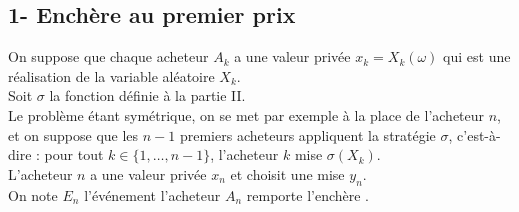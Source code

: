 \subsection*{1- Enchère au premier prix}

\noindent
On suppose que chaque acheteur $A_k$ a une valeur privée $x_k = 
X_k(\omega)$ qui est une réalisation de la variable aléatoire $X_k$.\\
Soit $\sigma$ la fonction définie à la partie II.\\
Le problème étant symétrique, on se met par exemple à la place de 
l'acheteur $n$, et on suppose que les $n-1$ premiers acheteurs 
appliquent la stratégie $\sigma$, c'est-à-dire : pour tout $k\in \{1, 
\ldots, n-1\}$, l'acheteur $k$ mise $\sigma(X_k)$.\\
L'acheteur $n$ a une valeur privée $x_n$ et choisit une mise $y_n$.\\
On note $E_n$ l'événement \og l'acheteur $A_n$ remporte l'enchère \fg{}.
